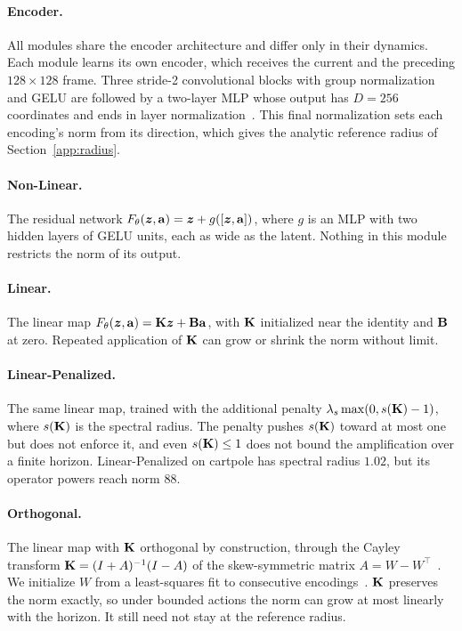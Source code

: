 \paragraph{Encoder.} All modules share the encoder architecture and differ only in their dynamics. Each module learns its own encoder, which receives the current and the preceding $128\times128$ frame. Three stride-2 convolutional blocks with group normalization and GELU are followed by a two-layer MLP whose output has $D=256$ coordinates and ends in layer normalization~\citep{Ba2016LayerNorm}. This final normalization sets each encoding's norm from its direction, which gives the analytic reference radius of Section~\ref{app:radius}.

\paragraph{Non-Linear.} The residual network $F_\theta(\bm{z},\mathbf a)=\bm{z}+g([\bm{z},\mathbf a])$, where $g$ is an MLP with two hidden layers of GELU units, each as wide as the latent. Nothing in this module restricts the norm of its output.

\paragraph{Linear.} The linear map $F_\theta(\bm{z},\mathbf a)=\mathbf{K}\bm{z}+\mathbf{B}\mathbf a$, with $\mathbf{K}$ initialized near the identity and $\mathbf{B}$ at zero. Repeated application of $\mathbf{K}$ can grow or shrink the norm without limit.

\paragraph{Linear-Penalized.} The same linear map, trained with the additional penalty $\lambda_s\max(0,s(\mathbf{K})-1)$, where $s(\mathbf{K})$ is the spectral radius. The penalty pushes $s(\mathbf{K})$ toward at most one but does not enforce it, and even $s(\mathbf{K})\le1$ does not bound the amplification over a finite horizon. Linear-Penalized on cartpole has spectral radius $1.02$, but its operator powers reach norm $88$.

\paragraph{Orthogonal.} The linear map with $\mathbf{K}$ orthogonal by construction, through the Cayley transform $\mathbf{K}=(I+A)^{-1}(I-A)$ of the skew-symmetric matrix $A=W-W^\top$~\citep{Helfrich2018}. We initialize $W$ from a least-squares fit to consecutive encodings~\citep{Schmid2010}. $\mathbf{K}$ preserves the norm exactly, so under bounded actions the norm can grow at most linearly with the horizon. It still need not stay at the reference radius.
\label{app:dmd}

